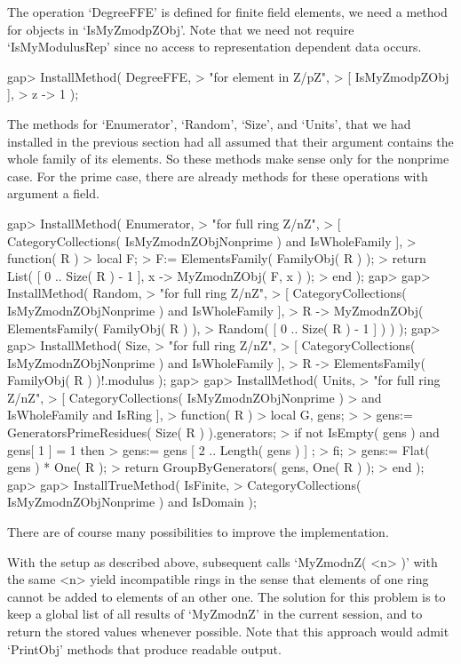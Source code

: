 The operation `DegreeFFE' is defined for finite field elements,
we need a method for objects in `IsMyZmodpZObj'.
Note that we need not require `IsMyModulusRep' since no access to
representation dependent data occurs.

\beginexample
gap> InstallMethod( DegreeFFE,
>    "for element in Z/pZ",
>    [ IsMyZmodpZObj ],
>    z -> 1 );
\endexample

The methods for `Enumerator', `Random', `Size', and `Units',
that we had installed in the previous section had all assumed that
their argument contains the whole family of its elements.
So these methods make sense only for the nonprime case.
For the prime case, there are already methods for these operations
with argument a field.

\beginexample
gap> InstallMethod( Enumerator,
>    "for full ring Z/nZ",
>    [ CategoryCollections( IsMyZmodnZObjNonprime ) and IsWholeFamily ],
>    function( R )
>    local F;
>    F:= ElementsFamily( FamilyObj( R ) );
>    return List( [ 0 .. Size( R ) - 1 ], x -> MyZmodnZObj( F, x ) );
>    end );
gap> 
gap> InstallMethod( Random,
>    "for full ring Z/nZ",
>    [ CategoryCollections( IsMyZmodnZObjNonprime ) and IsWholeFamily ],
>    R -> MyZmodnZObj( ElementsFamily( FamilyObj( R ) ),
>                    Random( [ 0 .. Size( R ) - 1 ] ) ) );
gap> 
gap> InstallMethod( Size,
>    "for full ring Z/nZ",
>    [ CategoryCollections( IsMyZmodnZObjNonprime ) and IsWholeFamily ],
>    R -> ElementsFamily( FamilyObj( R ) )!.modulus );
gap> 
gap> InstallMethod( Units,
>    "for full ring Z/nZ",
>    [     CategoryCollections( IsMyZmodnZObjNonprime )
>      and IsWholeFamily and IsRing ],
>    function( R )
>    local G, gens;
> 
>    gens:= GeneratorsPrimeResidues( Size( R ) ).generators;
>    if not IsEmpty( gens ) and gens[ 1 ] = 1 then
>      gens:= gens{ [ 2 .. Length( gens ) ] };
>    fi;
>    gens:= Flat( gens ) * One( R );
>    return GroupByGenerators( gens, One( R ) );
>    end );
gap> 
gap> InstallTrueMethod( IsFinite,
>    CategoryCollections( IsMyZmodnZObjNonprime ) and IsDomain );
\endexample



There are of course many possibilities to improve the implementation.

With the setup as described above,
subsequent calls `MyZmodnZ( <n> )' with the same <n> yield incompatible
rings in the sense that elements of one ring cannot be added to elements
of an other one.
The solution for this problem is to keep a global list of all results of
`MyZmodnZ' in the current {\GAP} session, and to return the stored values
whenever possible.
Note that this approach would admit `PrintObj' methods that produce
{\GAP} readable output.

